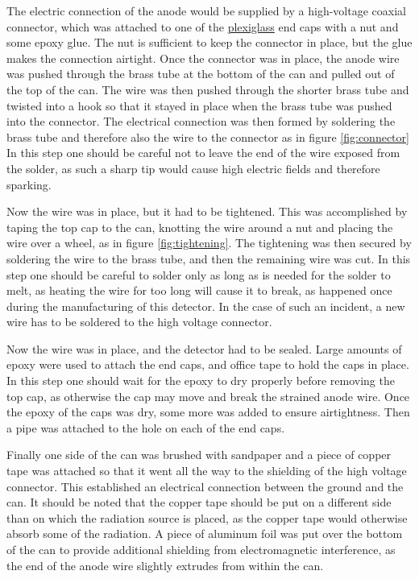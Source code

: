\documentclass[a4paper]{article}
\begin{document}
The electric connection of the anode would be supplied by a high-voltage coaxial connector, which was attached to one of the
\href{https://en.wikipedia.org/wiki/Poly(methyl_methacrylate)}{plexiglass}
end caps with a nut and some epoxy glue.
The nut is sufficient to keep the connector in place, but the glue makes the connection airtight.
Once the connector was in place, the anode wire was pushed through the brass tube at the bottom of the can and pulled out of the top of the can.
The wire was then pushed through the shorter brass tube and twisted into a hook so that it stayed in place when the brass tube was pushed into the connector.
The electrical connection was then formed by soldering the brass tube and therefore also the wire to the connector as in figure \ref{fig:connector}
In this step one should be careful not to leave the end of the wire exposed from the solder, as such a sharp tip would cause high electric fields and therefore sparking.

Now the wire was in place, but it had to be tightened.
This was accomplished by taping the top cap to the can, knotting the wire around a nut and placing the wire over a wheel, as in figure \ref{fig:tightening}.
The tightening was then secured by soldering the wire to the brass tube, and then the remaining wire was cut.
In this step one should be careful to solder only as long as is needed for the solder to melt, as heating the wire for too long will cause it to break, as happened once during the manufacturing of this detector.
In the case of such an incident, a new wire has to be soldered to the high voltage connector.

Now the wire was in place, and the detector had to be sealed.
Large amounts of epoxy were used to attach the end caps, and office tape to hold the caps in place.
In this step one should wait for the epoxy to dry properly before removing the top cap, as otherwise the cap may move and break the strained anode wire.
Once the epoxy of the caps was dry, some more was added to ensure airtightness.
Then a pipe was attached to the hole on each of the end caps.

Finally one side of the can was brushed with sandpaper and a piece of copper tape was attached so that it went all the way to the shielding of the high voltage connector.
This established an electrical connection between the ground and the can.
It should be noted that the copper tape should be put on a different side than on which the radiation source is placed, as the copper tape would otherwise absorb some of the radiation.
A piece of aluminum foil was put over the bottom of the can to provide additional shielding from electromagnetic interference, as the end of the anode wire slightly extrudes from within the can.
\end{document}
